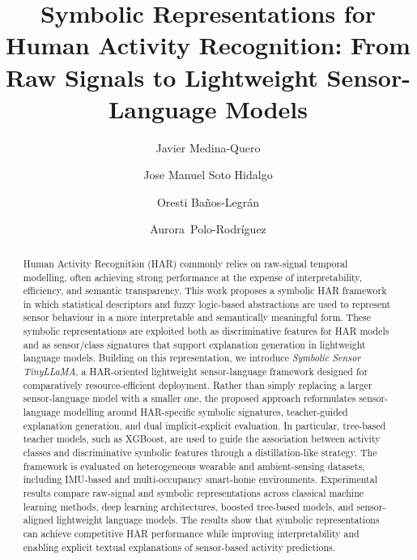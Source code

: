 \documentclass[preprint,12pt]{elsarticle}
\begin{document}
\begin{frontmatter}


\title{Symbolic Representations for Human Activity Recognition: From Raw Signals to Lightweight Sensor-Language Models}

\author[inst4]{Javier Medina-Quero}
\author[inst4]{Jose Manuel Soto Hidalgo}
\author[inst4]{Oresti Baños-Legrán}
\author[inst4]{Aurora~Polo-Rodríguez}


\begin{abstract}
Human Activity Recognition (HAR) commonly relies on raw-signal temporal modelling, often achieving strong performance at the expense of interpretability, efficiency, and semantic transparency. This work proposes a symbolic HAR framework in which statistical descriptors and fuzzy logic-based abstractions are used to represent sensor behaviour in a more interpretable and semantically meaningful form. These symbolic representations are exploited both as discriminative features for HAR models and as sensor/class signatures that support explanation generation in lightweight language models. Building on this representation, we introduce \emph{Symbolic Sensor TinyLLaMA}, a HAR-oriented lightweight sensor-language framework designed for comparatively resource-efficient deployment. Rather than simply replacing a larger sensor-language model with a smaller one, the proposed approach reformulates sensor-language modelling around HAR-specific symbolic signatures, teacher-guided explanation generation, and dual implicit-explicit evaluation. In particular, tree-based teacher models, such as XGBoost, are used to guide the association between activity classes and discriminative symbolic features through a distillation-like strategy. The framework is evaluated on heterogeneous wearable and ambient-sensing datasets, including IMU-based and multi-occupancy smart-home environments. Experimental results compare raw-signal and symbolic representations across classical machine learning methods, deep learning architectures, boosted tree-based models, and sensor-aligned lightweight language models. The results show that symbolic representations can achieve competitive HAR performance while improving interpretability and enabling explicit textual explanations of sensor-based activity predictions.
\end{abstract}




\end{frontmatter}
\end{document}

